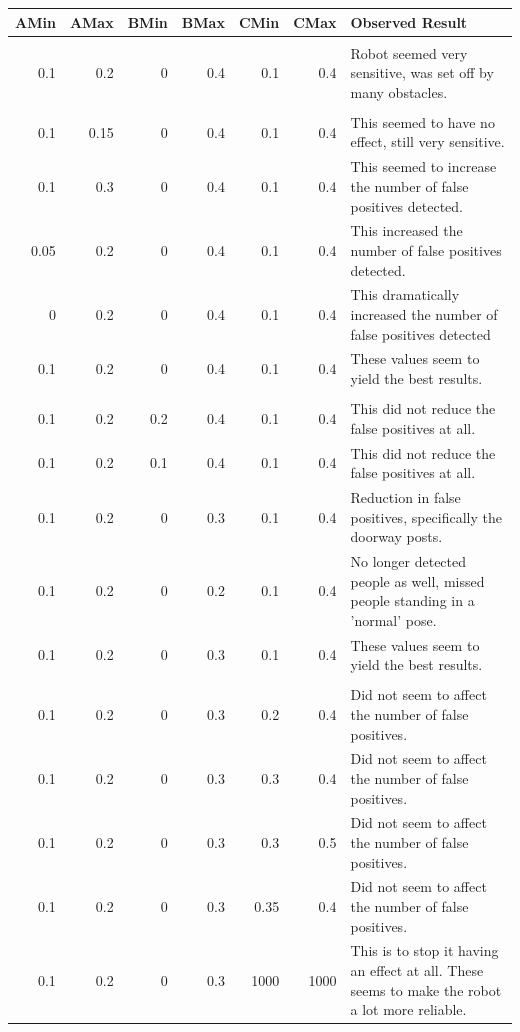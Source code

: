 \documentclass{article}
\begin{document}
\begin{supertabular}{r|r|r|r|r|r|p{8cm}}
AMin & AMax & BMin & BMax & CMin & CMax & Observed Result\\
\hline
 & & & & & & \\

0.1 & 0.2 & 0 & 0.4 & 0.1 & 0.4 & Robot seemed very sensitive, was set off by many obstacles.\\

 & & & & & & \\
 0.1 & 0.15 & 0 & 0.4 & 0.1 & 0.4 & This seemed to have no effect, still very sensitive.\\[1ex]
 0.1 & 0.3 & 0 & 0.4 & 0.1 & 0.4 & This seemed to increase the number of false positives detected.\\
 0.05 & 0.2 & 0 & 0.4 & 0.1 & 0.4 & This increased the number of false positives detected.\\[1ex]
 0 & 0.2 & 0 & 0.4 & 0.1 & 0.4 & This dramatically increased the number of false positives detected\\
 0.1 & 0.2 & 0 & 0.4 & 0.1 & 0.4 & These values seem to yield the best results.\\ [1ex]
 & & & & & & \\ 
 0.1 & 0.2 & 0.2 & 0.4 & 0.1 & 0.4 & This did not reduce the false positives at all.\\[1ex]
 0.1 & 0.2 & 0.1 & 0.4 & 0.1 & 0.4 & This did not reduce the false positives at all.\\[1ex]
 0.1 & 0.2 & 0 & 0.3 & 0.1 & 0.4 & Reduction in false positives, specifically the doorway posts.\\
 0.1 & 0.2 & 0 & 0.2 & 0.1 & 0.4 & No longer detected people as well, missed people standing in a 'normal' pose.\\
 0.1 & 0.2 & 0 & 0.3 & 0.1 & 0.4 & These values seem to yield the best results.\\ [1ex]
 & & & & & & \\
 0.1 & 0.2 & 0 & 0.3 & 0.2 & 0.4 & Did not seem to affect the number of false positives.\\[1ex]
 0.1 & 0.2 & 0 & 0.3 & 0.3 & 0.4 & Did not seem to affect the number of false positives.\\[1ex]
 0.1 & 0.2 & 0 & 0.3 & 0.3 & 0.5 & Did not seem to affect the number of false positives.\\[1ex]
 0.1 & 0.2 & 0 & 0.3 & 0.35 & 0.4 & Did not seem to affect the number of false positives.\\[1ex]
 
 0.1 & 0.2 & 0 & 0.3 & 1000 & 1000 & This is to stop it having an effect at all. These seems to make the robot a lot more reliable.\\
 \end{supertabular}
 
\end{document}
